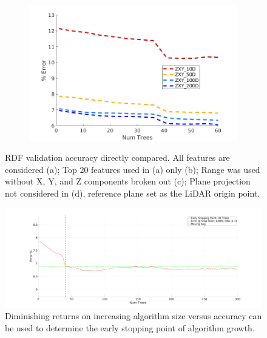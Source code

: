 \documentclass[journal,onecolumn]{IEEEtran}
\begin{document}
\begin{figure}[H]
\begin{subfigure}{0.45\textwidth}
			\caption[]{}
			\label{fig:range_mls_ransac_comp}
		\end{subfigure}
		\begin{subfigure}{0.45\textwidth}
			\centering
			\includegraphics[width=1\linewidth]{figures/ZXY}
			\caption[]{}
			\label{fig:t20_mls_ransac_comp}
		\end{subfigure}
		\caption[RDF Validation Accuracy]{RDF validation accuracy directly compared. All features are considered (a); Top 20 features used in (a) only (b); Range was used without X, Y, and Z components broken out (c); Plane projection not considered in (d), reference plane set as the LiDAR origin point.}
		\label{fig:xyz_mls_comp_2}
	\end{figure}

	\begin{figure}[H]
			\centering
			\includegraphics[width=0.75\linewidth]{figures/mls_zxy_early_stopping}
			\caption[Early Stopping]{Diminishing returns on increasing algorithm size versus accuracy can be used to determine the early stopping point of algorithm growth.}
			\label{fig:mls_zxy_early_stopping}
	\end{figure}
	
	
\end{document}
